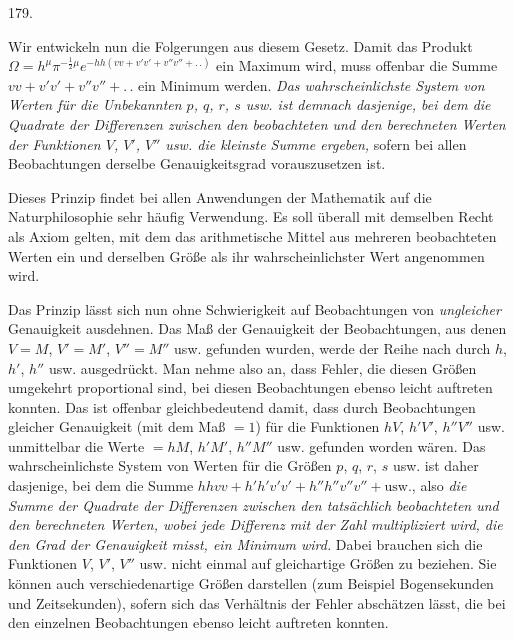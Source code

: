 \begin{center}\hypertarget{native-251-article179}{}179.\end{center}
Wir entwickeln nun die Folgerungen aus diesem Gesetz. Damit das Produkt $\Omega=h^\mu\pi^{-\frac{1}{2}\mu}e^{-hh(vv+v'v'+v''v''+\mathord{.}\,\mathord{.})}$ ein Maximum wird, muss offenbar die Summe $vv+v'v'+v''v''+\mathord{.}\,\mathord{.}$ ein Minimum werden. \emph{Das wahrscheinlichste System von Werten für die Unbekannten $p$, $q$, $r$, $s$ usw. ist demnach dasjenige, bei dem die Quadrate der Differenzen zwischen den beobachteten und den berechneten Werten der Funktionen $V$, $V'$, $V''$ usw. die kleinste Summe ergeben,} sofern bei allen Beobachtungen derselbe Genauigkeitsgrad vorauszusetzen ist.

Dieses Prinzip findet bei allen Anwendungen der Mathematik auf die Naturphilosophie sehr häufig Verwendung. Es soll überall mit demselben Recht als Axiom gelten, mit dem das arithmetische Mittel aus mehreren beobachteten Werten ein und derselben Größe als ihr wahrscheinlichster Wert angenommen wird.

Das Prinzip lässt sich nun ohne Schwierigkeit auf Beobachtungen von \emph{ungleicher} Genauigkeit ausdehnen. Das Maß der Genauigkeit der Beobachtungen, aus denen $V=M$, $V'=M'$, $V''=M''$ usw. gefunden wurden, werde der Reihe nach durch $h$, $h'$, $h''$ usw. ausgedrückt. Man nehme also an, dass Fehler, die diesen Größen umgekehrt proportional sind, bei diesen Beobachtungen ebenso leicht auftreten konnten. Das ist offenbar gleichbedeutend damit, dass durch Beobachtungen gleicher Genauigkeit (mit dem Maß $=1$) für die Funktionen $hV$, $h'V'$, $h''V''$ usw. unmittelbar die Werte $=hM$, $h'M'$, $h''M''$ usw. gefunden worden wären. Das wahrscheinlichste System von Werten für die Größen $p$, $q$, $r$, $s$ usw. ist daher dasjenige, bei dem die Summe $hhvv+h'h'v'v'+h''h''v''v''+\text{usw.}$, also \emph{die Summe der Quadrate der Differenzen zwischen den tatsächlich beobachteten und den berechneten Werten, wobei jede Differenz mit der Zahl multipliziert wird, die den Grad der Genauigkeit misst, ein Minimum wird.} Dabei brauchen sich die Funktionen $V$, $V'$, $V''$ usw. nicht einmal auf gleichartige Größen zu beziehen. Sie können auch verschiedenartige Größen darstellen (zum Beispiel Bogensekunden und Zeitsekunden), sofern sich das Verhältnis der Fehler abschätzen lässt, die bei den einzelnen Beobachtungen ebenso leicht auftreten konnten.
